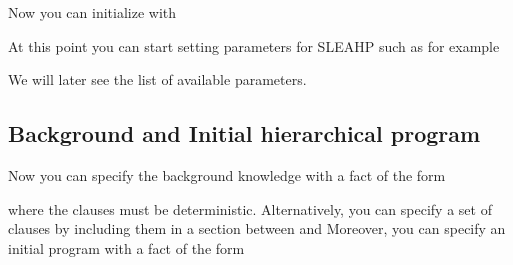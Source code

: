 \documentclass[letterpaper,10pt,english]{sphinxmanual}
\begin{document}
\begin{sphinxVerbatim}[commandchars=\\\{\}]
 
\end{sphinxVerbatim}

\sphinxAtStartPar
Now you can initialize  with

\begin{sphinxVerbatim}[commandchars=\\\{\}]
 
\end{sphinxVerbatim}

\sphinxAtStartPar
At this point you can start setting parameters for SLEAHP such as for example

\begin{sphinxVerbatim}[commandchars=\\\{\}]
 
 
 
\end{sphinxVerbatim}

\sphinxAtStartPar
We will later see the list of available parameters.


\subsection{Background and Initial hierarchical program}
\label{\detokenize{index:background-and-initial-hierarchical-program}}
\sphinxAtStartPar
Now you can specify the background knowledge with a fact of the form

\begin{sphinxVerbatim}[commandchars=\\\{\}]
    
\end{sphinxVerbatim}

\sphinxAtStartPar
where the clauses must be deterministic.
Alternatively, you can specify a set of clauses by including them in a section between  and 
Moreover, you can specify an initial program with a fact of the form
\end{document}
